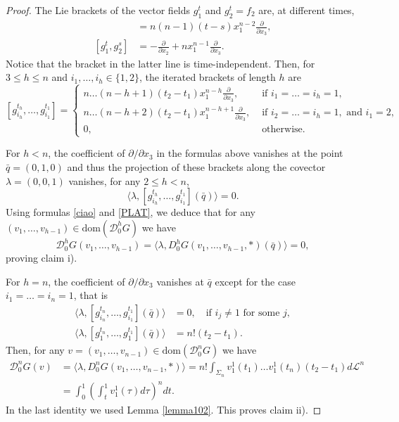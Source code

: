 \documentclass[12pt, reqno]{amsart}
\theoremstyle{plain}
\theoremstyle{definition}
\theoremstyle{remark}
\numberwithin{equation}{section}
\newcommand{\D}{\mathcal{D}}
\renewcommand{\L}{\mathcal{L}}
\newcommand{\0}{\theta}
\renewcommand{\d}{\partial}
\newcommand{\la}{\lambda}
\newcommand{\1}{{-1}}
\newcommand{\q}{\bar q}
\newcommand{\m}{n}
\renewcommand{\=}{\coloneqq}
\renewcommand{\.}{\dots}
\newcommand{\dom}{\mathrm{dom}}
\newcommand{\ddue}{\frac{\d}{\d x_2}}
\newcommand{\dtre}{\frac{\d}{\d x_3}}
\begin{document}
\begin{proof}
The Lie brackets of the vector fields $g_1^t$ and $g_2^t=f_2$ are, at different times,
 \begin{align*}
  [g_{1}^t ,g_{1}^{s}]&=\m(\m-1)(t-s)x_1^{\m-2}\frac{\d}{\d x_3},\\
  [g_{1}^t ,g_{2}^{s}]&=-\ddue+\m x_1^{\m-1}\dtre.
 \end{align*}
 Notice that the bracket in the latter line is time-independent.
  Then, for $3\leq h\leq\m$ and $i_1,\.,i_h\in\{1,2\}$, the   iterated brackets of length $h$ are 
 \[
  [g^{t_h}_{i_h},\.,g^{t_1}_{i_1}]=
  \begin{cases}
   \m\.(\m-h+1)(t_2-t_1)x_1^{\m-h}\dtre, &\text{ if } i_1=\.=i_h=1,\\
   \m\.(\m-h+2)(t_2-t_1)x_1^{\m-h+1}\dtre, &\text{ if } i_2=\.=i_h=1, \text{ and } i_1=2,\\
   0, &\text{ otherwise}.
  \end{cases}  
 \]

For $ h<\m$, the coefficient  of $\partial /\partial x_3$  in the formulas above vanishes  at the point $\q =(0,1,0)$ and thus
the projection of these brackets along the covector  $\la=(0,0,1)$ vanishes, for any $2\leq h<n$,
\[
 \langle \la,[g^{t_h}_{i_h},\.,g^{t_1}_{i_1}](\q) \rangle =0.
\]
Using formulas \eqref{ciao} and \eqref{PLAT}, we deduce that   for any   $(v_1,\.,v_{h-1})\in\dom(\D_0^hG)$ we have
\[
 \D_0^hG(v_1,\.,v_{h-1})=\langle \la,D_0^hG(v_1,\.,v_{h-1},*)(\q) \rangle=0, 
 \]
proving claim i).

For $h=\m$,   
the coefficient  of $\partial /\partial x_3$   vanishes  at  $\q $ except  for the case $i_1=\.=i_n=1$, that is
\begin{align*}
  \langle \la,[g^{t_n}_{i_n},\.,g^{t_1}_{i_1}](\q) \rangle &=0, \quad \text{if } i_j\neq1 \text{ for some } j,\\
  \langle \la,[g^{t_n}_1,\.,g^{t_1}_1](\q) \rangle &=\m!(t_2-t_1).
\end{align*}
Then, for any $v=(v_1,\.,v_{n-1})\in\dom(\D_0^nG)$ we have
\begin{align*}
 \D_0^\m G(v)&=\langle \la,D_0^nG(v_1,\.,v_{\m-1},*) \rangle=\m!\int_{\Sigma_n} v_1^1(t_1)\.v_1^1(t_n)(t_2-t_1)d\L^{n}\\
 &= \int_0^1\left(\int_t^1 v_1^1(\tau)d\tau\right)^n dt.
\end{align*}
In  the last identity we used Lemma \ref{lemma102}. This proves claim ii).
\end{proof}
\end{document}
